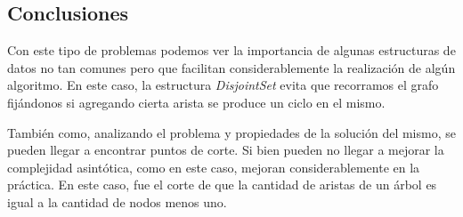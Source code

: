\quad 

\subsection{Conclusiones}

\quad Con este tipo de problemas podemos ver la importancia de algunas estructuras de datos no tan comunes pero que facilitan considerablemente la realizaci\'on de alg\'un algoritmo. En este caso, la estructura \textit{DisjointSet} evita que recorramos el grafo fij\'andonos si agregando cierta arista se produce un ciclo en el mismo.

\quad Tambi\'en como, analizando el problema y propiedades de la soluci\'on del mismo, se pueden llegar a encontrar puntos de corte. Si bien pueden no llegar a mejorar la complejidad asint\'otica, como en este caso, mejoran considerablemente en la pr\'actica. En este caso, fue el corte de que la cantidad de aristas  de un \'arbol es igual a la cantidad de nodos menos uno.
